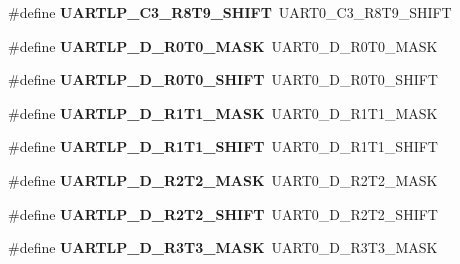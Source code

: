 \begin{DoxyCompactItemize}
\#define {\bfseries U\+A\+R\+T\+L\+P\+\_\+\+C3\+\_\+\+R8\+T9\+\_\+\+S\+H\+I\+FT}~U\+A\+R\+T0\+\_\+\+C3\+\_\+\+R8\+T9\+\_\+\+S\+H\+I\+FT
\item 
\mbox{\label{group___backward___compatibility___symbols_ga6c0de61b1bd7ca4438ffc57fe10550ef}} 
\#define {\bfseries U\+A\+R\+T\+L\+P\+\_\+\+D\+\_\+\+R0\+T0\+\_\+\+M\+A\+SK}~U\+A\+R\+T0\+\_\+\+D\+\_\+\+R0\+T0\+\_\+\+M\+A\+SK
\item 
\mbox{\label{group___backward___compatibility___symbols_gab2cd42b68d606b5ba4d1b496d41a9a1a}} 
\#define {\bfseries U\+A\+R\+T\+L\+P\+\_\+\+D\+\_\+\+R0\+T0\+\_\+\+S\+H\+I\+FT}~U\+A\+R\+T0\+\_\+\+D\+\_\+\+R0\+T0\+\_\+\+S\+H\+I\+FT
\item 
\mbox{\label{group___backward___compatibility___symbols_ga5ee9734a722b015b5cf6a8f0f242445b}} 
\#define {\bfseries U\+A\+R\+T\+L\+P\+\_\+\+D\+\_\+\+R1\+T1\+\_\+\+M\+A\+SK}~U\+A\+R\+T0\+\_\+\+D\+\_\+\+R1\+T1\+\_\+\+M\+A\+SK
\item 
\mbox{\label{group___backward___compatibility___symbols_ga9ae77e2a0f335113ae450295a927aafe}} 
\#define {\bfseries U\+A\+R\+T\+L\+P\+\_\+\+D\+\_\+\+R1\+T1\+\_\+\+S\+H\+I\+FT}~U\+A\+R\+T0\+\_\+\+D\+\_\+\+R1\+T1\+\_\+\+S\+H\+I\+FT
\item 
\mbox{\label{group___backward___compatibility___symbols_ga5e511688ca9d65b6f298ecf4c9983f92}} 
\#define {\bfseries U\+A\+R\+T\+L\+P\+\_\+\+D\+\_\+\+R2\+T2\+\_\+\+M\+A\+SK}~U\+A\+R\+T0\+\_\+\+D\+\_\+\+R2\+T2\+\_\+\+M\+A\+SK
\item 
\mbox{\label{group___backward___compatibility___symbols_ga9c26b19d89d75331664cd34366569eaa}} 
\#define {\bfseries U\+A\+R\+T\+L\+P\+\_\+\+D\+\_\+\+R2\+T2\+\_\+\+S\+H\+I\+FT}~U\+A\+R\+T0\+\_\+\+D\+\_\+\+R2\+T2\+\_\+\+S\+H\+I\+FT
\item 
\mbox{\label{group___backward___compatibility___symbols_ga147acf9d25c9aed961994759b4a09adf}} 
\#define {\bfseries U\+A\+R\+T\+L\+P\+\_\+\+D\+\_\+\+R3\+T3\+\_\+\+M\+A\+SK}~U\+A\+R\+T0\+\_\+\+D\+\_\+\+R3\+T3\+\_\+\+M\+A\+SK

\end{DoxyCompactItemize}

